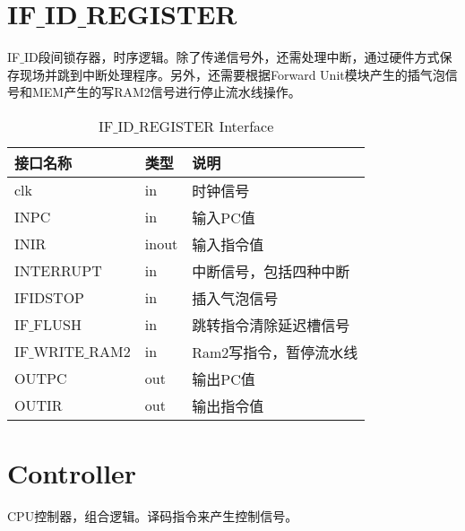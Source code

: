 \section{IF$\_$ID$\_$REGISTER}

IF$\_$ID段间锁存器，时序逻辑。除了传递信号外，还需处理中断，通过硬件方式保存现场并跳到中断处理程序。另外，还需要根据Forward Unit模块产生的插气泡信号和MEM产生的写RAM2信号进行停止流水线操作。

\begin{center}
\renewcommand{\arraystretch}{1.3}
\small
\begin{longtable}{|p{3cm}<{\centering}|p{1.4cm}<{\centering}|p{7cm}<{\centering}|}
\caption{IF$\_$ID$\_$REGISTER Interface}
\label{tab:treatments}\\
\hline
接口名称 & 类型 & 说明 \\
\hline
clk & in & 时钟信号 \\
\hline
INPC & in & 输入PC值 \\
\hline
INIR & inout & 输入指令值 \\
\hline
INTERRUPT & in & 中断信号，包括四种中断 \\
\hline
IFIDSTOP & in & 插入气泡信号 \\
\hline
IF$\_$FLUSH & in & 跳转指令清除延迟槽信号 \\
\hline
IF$\_$WRITE$\_$RAM2 & in & Ram2写指令，暂停流水线 \\
\hline
OUTPC & out & 输出PC值 \\
\hline
OUTIR & out &  输出指令值\\
\hline
\end{longtable}
\end{center}


\section{Controller}

CPU控制器，组合逻辑。译码指令来产生控制信号。


